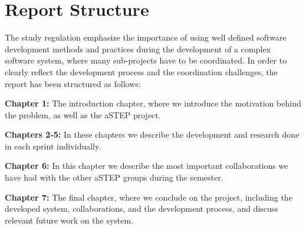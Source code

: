 \section{Report Structure} \label{sec:report_structure}
The study regulation emphasize the importance of using well defined software development methods and practices during the development of a complex software system, where many sub-projects have to be coordinated. In order to clearly reflect the development process and the coordination challenges, the report has been structured as follows:

\textbf{Chapter 1:} The introduction chapter, where we introduce the motivation behind the problem, as well as the aSTEP project.

\textbf{Chapters 2-5:} In these chapters we describe the development and research done in each sprint individually.

\textbf{Chapter 6:} In this chapter we describe the most important collaborations we have had with the other aSTEP groups during the semester.

\textbf{Chapter 7:} The final chapter, where we conclude on the project, including the developed system, collaborations, and the development process, and discuss relevant future work on the system.
